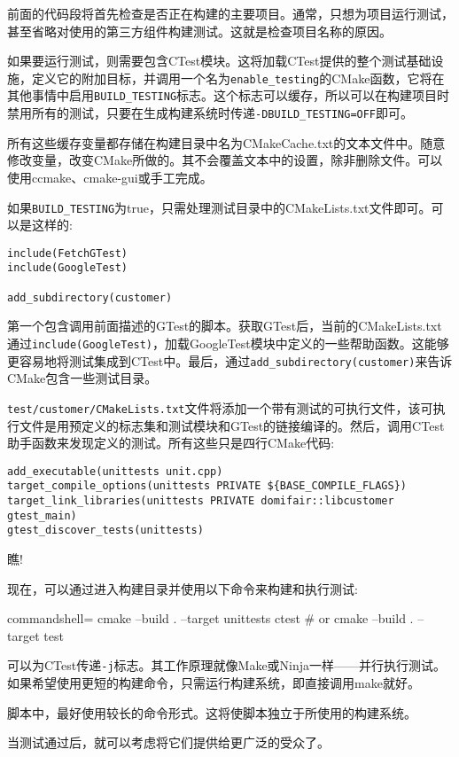 前面的代码段将首先检查是否正在构建的主要项目。通常，只想为项目运行测试，甚至省略对使用的第三方组件构建测试。这就是检查项目名称的原因。

如果要运行测试，则需要包含CTest模块。这将加载CTest提供的整个测试基础设施，定义它的附加目标，并调用一个名为\texttt{enable\_testing}的CMake函数，它将在其他事情中启用\texttt{BUILD\_TESTING}标志。这个标志可以缓存，所以可以在构建项目时禁用所有的测试，只要在生成构建系统时传递\texttt{-DBUILD\_TESTING=OFF}即可。

所有这些缓存变量都存储在构建目录中名为CMakeCache.txt的文本文件中。随意修改变量，改变CMake所做的。其不会覆盖文本中的设置，除非删除文件。可以使用ccmake、cmake-gui或手工完成。

如果\texttt{BUILD\_TESTING}为true，只需处理测试目录中的CMakeLists.txt文件即可。可以是这样的:

\begin{lstlisting}[style=styleCMake]
include(FetchGTest)
include(GoogleTest)

add_subdirectory(customer)
\end{lstlisting}

第一个包含调用前面描述的GTest的脚本。获取GTest后，当前的CMakeLists.txt通过\texttt{include(GoogleTest)}，加载GoogleTest模块中定义的一些帮助函数。这能够更容易地将测试集成到CTest中。最后，通过\texttt{add\_subdirectory(customer)}来告诉CMake包含一些测试目录。

\texttt{test/customer/CMakeLists.txt}文件将添加一个带有测试的可执行文件，该可执行文件是用预定义的标志集和测试模块和GTest的链接编译的。然后，调用CTest助手函数来发现定义的测试。所有这些只是四行CMake代码:

\begin{lstlisting}[style=styleCMake]
add_executable(unittests unit.cpp)
target_compile_options(unittests PRIVATE ${BASE_COMPILE_FLAGS})
target_link_libraries(unittests PRIVATE domifair::libcustomer gtest_main)
gtest_discover_tests(unittests)
\end{lstlisting}

瞧!

现在，可以通过进入构建目录并使用以下命令来构建和执行测试:

\begin{tcblisting}{commandshell={}}
cmake --build . --target unittests
ctest # or cmake --build . --target test
\end{tcblisting}

可以为CTest传递\texttt{-j}标志。其工作原理就像Make或Ninja一样——并行执行测试。如果希望使用更短的构建命令，只需运行构建系统，即直接调用make就好。

\begin{tcolorbox}[colback=blue!5!white,colframe=blue!75!black, title=Note]
\hspace*{0.7cm}脚本中，最好使用较长的命令形式。这将使脚本独立于所使用的构建系统。
\end{tcolorbox}

当测试通过后，就可以考虑将它们提供给更广泛的受众了。






